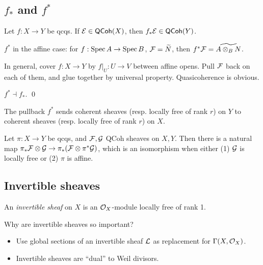 \documentclass[11pt]{amsart}
\begin{document}
\subsection{$f_\ast$ and $f^\ast$}

\begin{prop}
    Let $f:X\to Y$ be qcqs. If $\mathcal{E}\in \mathsf{QCoh}(X)$, then $f_\ast \mathcal{E}\in \mathsf{QCoh}(Y)$.
\end{prop}

\begin{defn}
    $f^\ast$ in the affine case: for $f:\operatorname{Spec} A\to \operatorname{Spec} B$, $\mathcal{F} = \widetilde{N}$, then $f^\ast \mathcal{F} = \widetilde{A\otimes_B N}$.

    In general, cover $f:X\to Y$ by $f|_U:U\to V$ between affine opens. Pull $\mathcal{F}$ back on each of them, and glue together by universal property. Quasicoherence is obvious.
\end{defn}

\begin{prop}
    $f^\ast \dashv f_\ast$. \qed
\end{prop}

\begin{prop}
    The pullback $f^\ast$ sends coherent sheaves (resp. locally free of rank $r$) on $Y$ to coherent sheaves (resp. locally free of rank $r$) on $X$.
\end{prop}

\begin{prop}
    
\end{prop}

\begin{prop}
    Let $\pi:X\to Y$ be qcqs, and $\mathcal{F}, \mathcal{G}$ QCoh sheaves on $X,Y$. Then there is a natural map $\pi_\ast \mathcal{F}\otimes \mathcal{G} \to \pi_\ast(\mathcal{F}\otimes \pi^{\ast}\mathcal{G})$, which is an isomorphism when either (1) $\mathcal{G}$ is locally free or (2) $\pi$ is affine.
\end{prop}


\subsection{Invertible sheaves}

\begin{defn}
    An \emph{invertible sheaf} on $X$ is an $\mathcal{O}_X$-module locally free of rank 1.
\end{defn}

Why are invertible sheaves so important?
\begin{itemize}
    \item Use global sections of an invertible sheaf $\mathcal{L}$ as replacement for $\Gamma(X,\mathcal{O}_X)$.
    \item Invertible sheaves are ``dual'' to Weil divisors.
\end{itemize}
\end{document}
